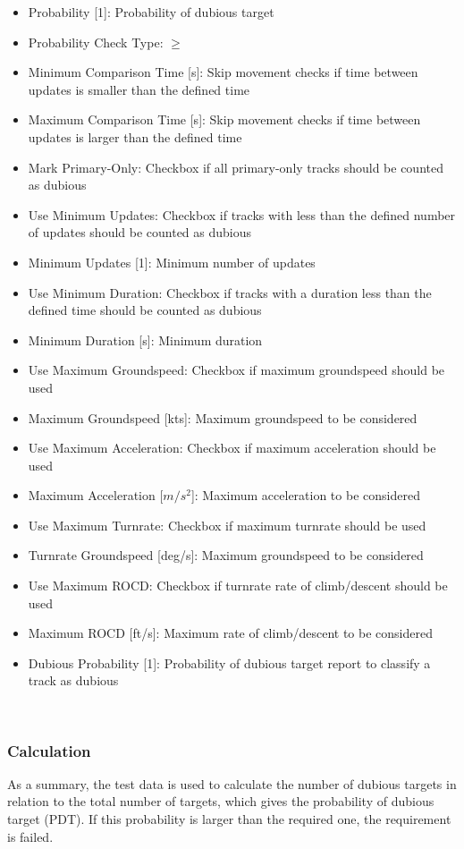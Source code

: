 \begin{itemize}  
\item Probability [1]: Probability of dubious target
\item Probability Check Type: $\geq$
\item Minimum Comparison Time [s]: Skip movement checks if time between updates is smaller than the defined time
\item Maximum Comparison Time [s]: Skip movement checks if time between updates is larger than the defined time
\item Mark Primary-Only: Checkbox if all primary-only tracks should be counted as dubious
\item Use Minimum Updates: Checkbox if tracks with less than the defined number of updates should be counted as dubious
\item Minimum Updates [1]: Minimum number of updates
\item Use Minimum Duration: Checkbox if tracks with a duration less than the defined time should be counted as dubious
\item Minimum Duration [s]: Minimum duration
\item Use Maximum Groundspeed: Checkbox if maximum groundspeed should be used
\item Maximum Groundspeed [kts]: Maximum groundspeed to be considered
\item Use Maximum Acceleration: Checkbox if maximum acceleration should be used
\item Maximum Acceleration [$m/s^{2}$]: Maximum acceleration to be considered
\item Use Maximum Turnrate: Checkbox if maximum turnrate should be used
\item Turnrate Groundspeed [deg/s]: Maximum groundspeed to be considered
\item Use Maximum ROCD: Checkbox if turnrate rate of climb/descent should be used
\item Maximum ROCD [ft/s]: Maximum  rate of climb/descent to be considered
\item Dubious Probability [1]: Probability of dubious target report to classify a track as dubious
\end{itemize}
\ \\

\subsubsection{Calculation}

As a summary, the test data is used to calculate the number of dubious targets in relation to the total number of targets, which gives the probability of dubious target (PDT). If this probability is larger than the required one, the requirement is failed. \\

